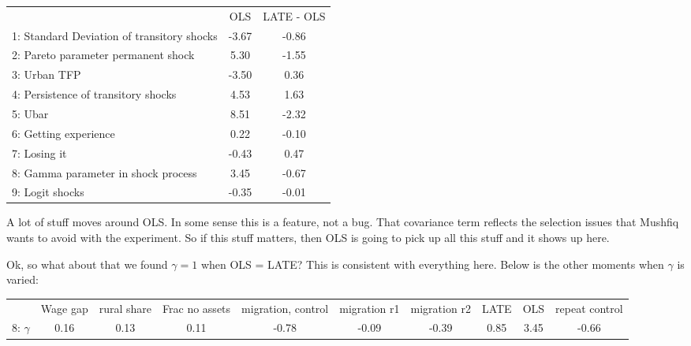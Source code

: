 \documentclass[pdftex,11pt]{article}
\renewcommand{\arraystretch}{.7}
\begin{document}
\begin{table}[!h]
\footnotesize
\setlength {\tabcolsep}{1.5mm}
\renewcommand{\arraystretch}{2.25}
\begin{center}\label{tb:ols-LATE}
\begin{tabular}{l c c}
\hline
\hline
& OLS & LATE - OLS \\
1: Standard Deviation of transitory shocks &   -3.67   &-0.86     \\
2: Pareto parameter permanent shock &           5.30   &-1.55     \\
3: Urban TFP &                                 -3.50   & 0.36     \\
4: Persistence of transitory shocks &            4.53  & 1.63     \\
5: Ubar &                                       8.51   &-2.32     \\
6: Getting experience &                          0.22  &-0.10     \\
7: Losing it &                                -0.43    & 0.47     \\
8: Gamma parameter in shock process &           3.45   &-0.67     \\
9: Logit shocks &                              -0.35   &-0.01     \\
\hline                                                 
\hline
\end{tabular}
\end{center}
\end{table}

A lot of stuff moves around OLS. In some sense this is a feature, not a bug. That covariance term reflects the selection issues that Mushfiq wants to avoid with the experiment. So if this stuff matters, then OLS is going to pick up all this stuff and it shows up here.

Ok, so what about that we found $\gamma = 1$ when OLS = LATE? This is consistent with everything here. Below is the other moments when $\gamma$ is varied:
\begin{table}[!h]
\footnotesize
\setlength {\tabcolsep}{1.5mm}
\renewcommand{\arraystretch}{2.25}
\begin{center}\label{tb:employment}
\begin{tabular}{l c c c c c c c c c }
\hline
\hline
           & Wage gap & rural share &  Frac no assets & migration, control &  migration r1 & migration r2 & LATE & OLS &  repeat control \\
8: $\gamma$  &  0.16  &  0.13   & 0.11  & -0.78  & -0.09 &  -0.39   & 0.85  &  3.45 & -0.66  \\

\hline
\hline
\end{tabular}
\end{center}
\end{table}
\end{document}
